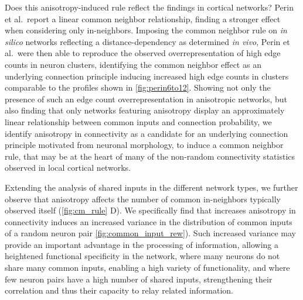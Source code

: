 Does this anisotropy-induced rule reflect the findings in cortical
networks?  Perin et al.\ report a linear common neighbor relationship,
finding a stronger effect when considering only in-neighbors. Imposing
the common neighbor rule on \textit{in silico} networks reflecting a
distance-dependency as determined \textit{in vivo}, Perin et al.\ were
then able to reproduce the observed overrepresentation of high edge
counts in neuron clusters, identifying the common neighbor effect as
an underlying connection principle inducing increased high edge counts
in clusters comparable to the profiles shown in
\autoref{fig:perin6to12}. Showing not only the presence of such an
edge count overrepresentation in anisotropic networks, but also
finding that only networks featuring anisotropy display an
approximately linear relationship between common inputs and connection
probability, we identify anisotropy in connectivity as a candidate for
an underlying connection principle motivated from neuronal morphology,
to induce a common neighbor rule, that may be at the heart of many of
the non-random connectivity statistics observed in local cortical
networks.

Extending the analysis of shared inputs in the different network
types, we further observe that anisotropy affects the number of common
in-neighbors typically observed itself (\autoref{fig:cm_rule} D). We
specifically find that increases anisotropy in connectivity induces an
increased variance in the distribution of common inputs of a random
neuron pair \autoref{fig:common_input_rew}). Such increased variance
may provide an important advantage in the processing of information,
allowing a heightened functional specificity in the network, where
many neurons do not share many common inputs, enabling a high variety
of functionality, and where few neuron pairs have a high number of
shared inputs, strengthening their correlation and thus their capacity
to relay related information.



